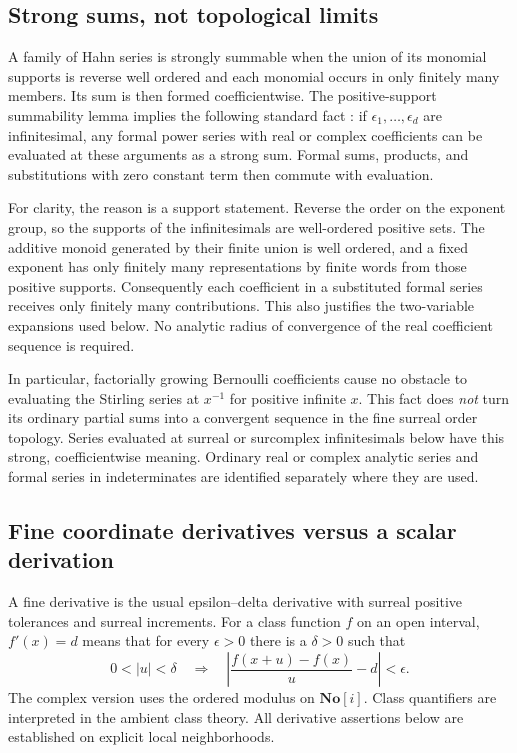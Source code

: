 \documentclass[11pt,letterpaper]{article}
\numberwithin{equation}{section}
\theoremstyle{plain}
\theoremstyle{definition}
\theoremstyle{remark}
\newcommand{\SC}{\mathbf{No}[i]}
\newcommand{\abs}[1]{\lvert#1\rvert}
\begin{document}
\subsection{Strong sums, not topological limits}
A family of Hahn series is strongly summable when the union of its monomial
supports is reverse well ordered and each monomial occurs in only finitely
many members. Its sum is then formed coefficientwise. The positive-support
summability lemma implies the following standard fact \cite{Neumann,vdDE}:
if $\epsilon_1,\ldots,\epsilon_d$ are infinitesimal, any formal power series
with real or complex coefficients can be evaluated at these arguments as a
strong sum. Formal sums, products, and substitutions with zero constant term
then commute with evaluation.

For clarity, the reason is a support statement. Reverse the order on the
exponent group, so the supports of the infinitesimals are well-ordered
positive sets. The additive monoid generated by their finite union is well
ordered, and a fixed exponent has only finitely many representations by
finite words from those positive supports. Consequently each coefficient
in a substituted formal series receives only finitely many contributions.
This also justifies the two-variable expansions used below. No analytic
radius of convergence of the real coefficient sequence is required.

In particular, factorially growing Bernoulli coefficients cause no obstacle
to evaluating the Stirling series at $x^{-1}$ for positive infinite $x$.
This fact does \emph{not} turn its ordinary partial sums into a convergent
sequence in the fine surreal order topology. Series evaluated at surreal or
surcomplex infinitesimals below have this strong, coefficientwise meaning.
Ordinary real or complex analytic series and formal series in indeterminates
are identified separately where they are used.

\subsection{Fine coordinate derivatives versus a scalar derivation}
A fine derivative is the usual epsilon--delta derivative with surreal
positive tolerances and surreal increments. For a class function $f$ on an
open interval, $f'(x)=d$ means that for every $\epsilon>0$ there is a
$\delta>0$ such that
\[
 0<\abs{u}<\delta\quad\Longrightarrow\quad
 \left|\frac{f(x+u)-f(x)}u-d\right|<\epsilon.
\]
The complex version uses the ordered modulus on $\SC$. Class quantifiers
are interpreted in the ambient class theory. All derivative assertions below
are established on explicit local neighborhoods.
\end{document}
